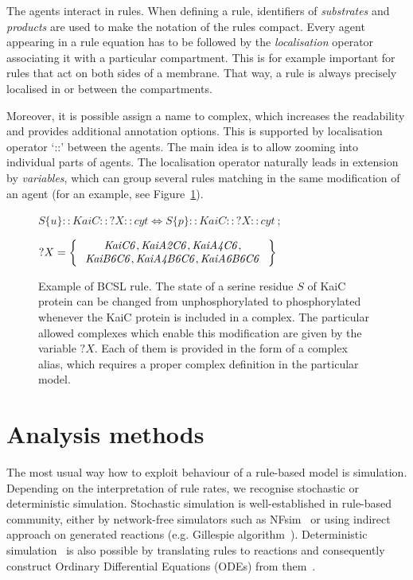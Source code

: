 \documentclass[11pt,a4paper]{report}
\begin{document}
The agents interact in rules. When defining a rule, identifiers of \emph{substrates} and \emph{products} are used to make the notation of the rules compact. Every agent appearing in a rule equation has to be followed by the \emph{localisation} operator associating it with a particular compartment. This is for example important for rules that act on both sides of a membrane. That way, a rule is always precisely localised in or between the compartments.

Moreover, it is possible assign a name to complex, which increases the readability and provides additional annotation options. This is supported by localisation operator `{::}' between the agents. The main idea is to allow zooming into individual parts of agents. The localisation operator naturally leads in extension by \emph{variables}, which can group several rules matching in the same modification of an agent (for an example, see Figure~\ref{BCSL_rule}).

\begin{figure}
	\begin{center}
		$ S\{u\}{::}KaiC{::}?X{::}cyt \Leftrightarrow S\{p\}{::}KaiC{::}?X{::}cyt ~;~$
		
		$ ?X = \Set{
			\begin{array}{c}
			\mathit{KaiC6}, \mathit{KaiA2C6}, \mathit{KaiA4C6},\\
			\mathit{KaiB6C6}, \mathit{KaiA4B6C6}, \mathit{KaiA6B6C6}
			\end{array}
		}$
	\end{center}
	\caption{Example of BCSL rule. The state of a serine residue $S$ of KaiC protein can be changed from unphosphorylated to phosphorylated whenever the KaiC protein is included in a complex. The particular allowed complexes which enable this modification are given by the variable $?X$. Each of them is provided in the form of a complex alias, which requires a proper complex definition in the particular model.}
	\label{BCSL_rule}
\end{figure}

\section{Analysis methods}

The most usual way how to exploit behaviour of a rule-based model is simulation. Depending on the interpretation of rule rates, we recognise stochastic or deterministic simulation. Stochastic simulation is well-established in rule-based community, either by network-free simulators such as NFsim~\cite{sneddon2011efficient} or using indirect approach on generated reactions (e.g. Gillespie algorithm~\cite{GILLESPIE1976403}). Deterministic simulation~\cite{Poole2000} is also possible by translating rules to reactions and consequently construct Ordinary Differential Equations (ODEs) from them~\cite{higham2008modeling}.
\end{document}
